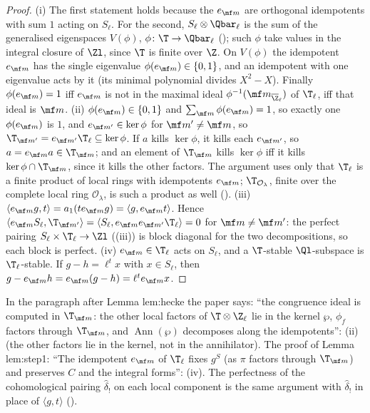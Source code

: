 \begin{proof}
(i) The first statement holds because the $e_{\mf m}$ are orthogonal idempotents with sum $1$ acting on $S_\ell$. For the second, $S_\ell\otimes\Qbar_\ell$ is the sum of the generalised
eigenspaces $V(\phi)$, $\phi\colon\T\to\Qbar_\ell$ (); such $\phi$ take values in the integral closure of $\Zl$, since $\T$ is finite over $\Z$. On $V(\phi)$ the idempotent $e_{\mf m}$
has the single eigenvalue $\phi(e_{\mf m})\in\{0,1\}$, and an idempotent with one eigenvalue acts by it (its minimal polynomial divides $X^2-X$). Finally $\phi(e_{\mf m})=1$ iff $e_{\mf m}$ is not
in the maximal ideal $\phi^{-1}(\mf m_{\overline\Z_\ell})$ of $\T_\ell$, iff that ideal is $\mf m$. (ii) $\phi(e_{\mf m})\in\{0,1\}$ and $\sum_{\mf m}\phi(e_{\mf m})=1$, so exactly one $\phi(e_{\mf m})$ is $1$, and $e_{\mf m'}\in\ker\phi$
for $\mf m'\ne\mf m$, so $\T_{\mf m'}=e_{\mf m'}\T_\ell\subseteq\ker\phi$. If $a$ kills $\ker\phi$, it kills each $e_{\mf m'}$, so $a=e_{\mf m}a\in\T_{\mf m}$; and an element of $\T_{\mf m}$ kills $\ker\phi$ iff it kills
$\ker\phi\cap\T_{\mf m}$, since it kills the other factors. The argument uses only that $\T_\ell$ is a finite product of local rings with idempotents $e_{\mf m}$; $\T_{\mathcal O_\lambda}$, finite over the
complete local ring $\mathcal O_\lambda$, is such a product as well (). (iii) $\langle e_{\mf m}g,t\rangle=a_1(te_{\mf m}g)=\langle g,e_{\mf m}t\rangle$. Hence $\langle e_{\mf m}S_\ell,\T_{\mf m'}\rangle=\langle S_\ell,e_{\mf m}e_{\mf m'}\T_\ell\rangle=0$ for $\mf m\ne\mf m'$: the
perfect pairing $S_\ell\times\T_\ell\to\Zl$ ((iii)) is block diagonal for the two decompositions, so each block is perfect. (iv) $e_{\mf m}\in\T_\ell$ acts on $S_\ell$, and a
$\T$-stable $\Ql$-subspace is $\T_\ell$-stable. If $g-h=\ell^tx$ with $x\in S_\ell$, then $g-e_{\mf m}h=e_{\mf m}(g-h)=\ell^te_{\mf m}x$.
\end{proof}

\begin{paperlink}\label{pl:hecke:local}
In the paragraph after Lemma lem:hecke the paper says: ``the congruence ideal is computed in $\T_{\mf m}$: the other local factors of $\T\otimes\Z_\ell$ lie in the kernel $\wp$, $\phi_f$ factors through
$\T_{\mf m}$, and $\operatorname{Ann}(\wp)$ decomposes along the idempotents'': (ii) (the other factors lie in the kernel, not in the annihilator). The proof of
Lemma lem:step1: ``The idempotent $e_{\mf m}$ of $\T_\ell$ fixes $g^S$ (as $\pi$ factors through $\T_{\mf m}$) and preserves $C$ and the integral forms'':
(iv). The perfectness of the cohomological pairing $\hat\delta_!$ on each local component is the same argument with $\hat\delta_!$ in place of $\langle g,t\rangle$
().
\end{paperlink}

